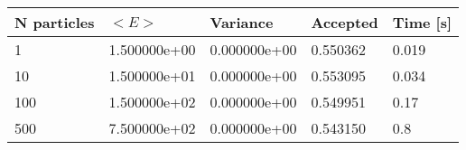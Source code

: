 \begin{table}[h!]
\begin{tabular}{|l|l|l|l|l|}
\hline 
N particles & $<E>$ & Variance & Accepted & Time [s]\\ 
 \hline 
1 & 1.500000e+00 & 0.000000e+00 & 0.550362 & 0.019 \\ \hline 
10 & 1.500000e+01 & 0.000000e+00 & 0.553095 & 0.034 \\ \hline 
100 & 1.500000e+02 & 0.000000e+00 & 0.549951 & 0.17 \\ \hline 
500 & 7.500000e+02 & 0.000000e+00 & 0.543150 & 0.8 \\ \hline 
\end{tabular}
\label{tab:ha3} 
\end{table} 
